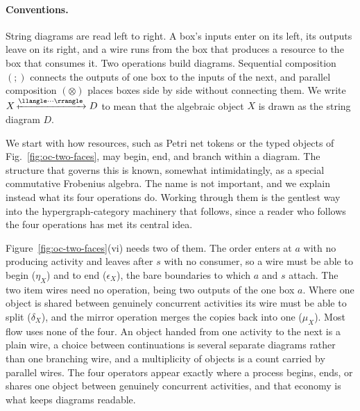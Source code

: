 \paragraph{Conventions.} String diagrams are read left to right. A box's inputs enter on
its left, its outputs leave on its right, and a wire runs from the box that produces a
resource to the box that consumes it. Two operations build diagrams. Sequential
composition $(;)$ connects the outputs of one box to the inputs of the next, and parallel
composition $(\otimes)$ places boxes side by side without connecting them. We write
$X\xmapsto{\llangle \cdot\cdot\cdot \rrangle} D$ to mean that the algebraic object $X$ is
drawn as the string diagram $D$.

We start with how resources, such as Petri net tokens or the typed objects of
Fig.~\ref{fig:oc-two-faces}, may begin, end, and branch within a diagram. The
structure that governs this is known, somewhat intimidatingly, as a special
commutative Frobenius algebra. The name is not important, and we explain instead
what its four operations do. Working through them is the gentlest way into the
hypergraph-category machinery that follows, since a reader who follows the four
operations has met its central idea.

Figure~\ref{fig:oc-two-faces}(vi) needs two of them. The order enters
at $a$ with no producing activity and leaves after $s$ with no consumer, so a
wire must be able to begin ($\eta_X$) and to end ($\epsilon_X$), the bare
boundaries to which $a$ and $s$ attach. The two item wires need no operation,
being two outputs of the one box $a$. Where one object is shared between
genuinely concurrent activities its wire must be able to split ($\delta_X$), and
the mirror operation merges the copies back into one ($\mu_X$). Most flow uses
none of the four. An object
handed from one activity to the next is a plain wire, a choice between
continuations is several separate diagrams rather than one branching wire, and
a multiplicity of objects is a count carried by parallel wires. The four
operators appear exactly where a process begins, ends, or shares one object
between genuinely concurrent activities, and that economy is what keeps
diagrams readable.


